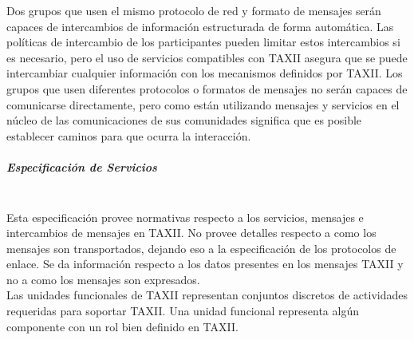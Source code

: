 Dos grupos que usen el mismo protocolo de red y formato de mensajes serán 
capaces de intercambios de información estructurada de forma automática. Las 
políticas de intercambio de los participantes pueden limitar estos intercambios 
si es necesario, pero el uso de servicios compatibles con TAXII asegura que se 
puede intercambiar cualquier información con los mecanismos definidos por TAXII. 
Los grupos que usen diferentes protocolos o formatos de mensajes no serán 
capaces de comunicarse directamente, pero como están utilizando mensajes y 
servicios en el núcleo de las comunicaciones de sus comunidades significa que es 
posible establecer caminos para que ocurra la interacción.

\subparagraph{Especificación de Servicios}\ \\

Esta especificación provee normativas respecto a los servicios, mensajes e 
intercambios de mensajes en TAXII. No provee detalles respecto a como los 
mensajes son transportados, dejando eso a la especificación de los protocolos de 
enlace. Se da información respecto a los datos presentes en los mensajes TAXII y 
no a como los mensajes son expresados.\\

Las unidades funcionales de TAXII representan conjuntos discretos de actividades 
requeridas para soportar TAXII. Una unidad funcional representa algún componente 
con un rol bien definido en TAXII.

